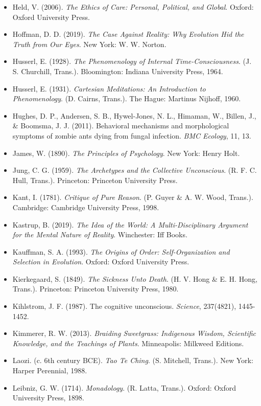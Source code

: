 \begin{itemize}[nosep,leftmargin=*]
  \item Held, V. (2006). \textit{The Ethics of Care: Personal, Political, and Global}. Oxford: Oxford University Press.
  \item Hoffman, D. D. (2019). \textit{The Case Against Reality: Why Evolution Hid the Truth from Our Eyes}. New York: W. W. Norton.
  \item Husserl, E. (1928). \textit{The Phenomenology of Internal Time-Consciousness}. (J. S. Churchill, Trans.). Bloomington: Indiana University Press, 1964.
  \item Husserl, E. (1931). \textit{Cartesian Meditations: An Introduction to Phenomenology}. (D. Cairns, Trans.). The Hague: Martinus Nijhoff, 1960.
  \item Hughes, D. P., Andersen, S. B., Hywel-Jones, N. L., Himaman, W., Billen, J., \& Boomsma, J. J. (2011). Behavioral mechanisms and morphological symptoms of zombie ants dying from fungal infection. \textit{BMC Ecology}, 11, 13.
  \item James, W. (1890). \textit{The Principles of Psychology}. New York: Henry Holt.
  \item Jung, C. G. (1959). \textit{The Archetypes and the Collective Unconscious}. (R. F. C. Hull, Trans.). Princeton: Princeton University Press.
  \item Kant, I. (1781). \textit{Critique of Pure Reason}. (P. Guyer \& A. W. Wood, Trans.). Cambridge: Cambridge University Press, 1998.
  \item Kastrup, B. (2019). \textit{The Idea of the World: A Multi-Disciplinary Argument for the Mental Nature of Reality}. Winchester: Iff Books.
  \item Kauffman, S. A. (1993). \textit{The Origins of Order: Self-Organization and Selection in Evolution}. Oxford: Oxford University Press.
  \item Kierkegaard, S. (1849). \textit{The Sickness Unto Death}. (H. V. Hong \& E. H. Hong, Trans.). Princeton: Princeton University Press, 1980.
  \item Kihlstrom, J. F. (1987). The cognitive unconscious. \textit{Science}, 237(4821), 1445-1452.
  \item Kimmerer, R. W. (2013). \textit{Braiding Sweetgrass: Indigenous Wisdom, Scientific Knowledge, and the Teachings of Plants}. Minneapolis: Milkweed Editions.
  \item Laozi. (c. 6th century BCE). \textit{Tao Te Ching}. (S. Mitchell, Trans.). New York: Harper Perennial, 1988.
  \item Leibniz, G. W. (1714). \textit{Monadology}. (R. Latta, Trans.). Oxford: Oxford University Press, 1898.

\end{itemize}
